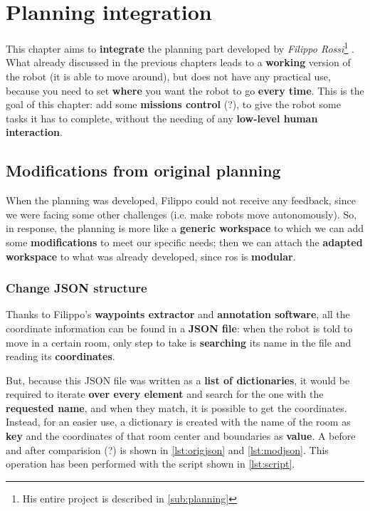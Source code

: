 \chapter{Planning integration} %
\label{cha:planningbridge}

This chapter aims to \textbf{integrate} the planning part developed by \textit{Filippo Rossi}\footnote{His entire project is described in \autoref{sub:planning}} \cite{fr}. What already discussed in the previous chapters leads to a \textbf{working} version of the robot (it is able to move around), but does not have any practical use, because you need to set \textbf{where} you want the robot to go \textbf{every time}. This is the goal of this chapter: add some \textbf{missions control} (?), to give the robot some tasks it has to complete, without the needing of any \textbf{low-level human interaction}.

\section{Modifications from original planning}

When the planning was developed, Filippo could not receive any feedback, since we were facing some other challenges (i.e. make robots move autonomously). So, in response, the planning is more like a \textbf{generic workspace} to which we can add some \textbf{modifications} to meet our specific needs; then we can attach the \textbf{adapted workspace} to what was already developed, since \acrshort{ros} is \textbf{modular}.


\subsection{Change JSON structure}
\label{sub:json}

Thanks to Filippo's \textbf{waypoints extractor} and  \textbf{annotation software}, all the coordinate information can be found in a \textbf{JSON file}: when the robot is told to move in a certain room, only step to take is \textbf{searching} its name in the file and reading its \textbf{coordinates}.

But, because this JSON file was written as a \textbf{list of dictionaries}, it would be required to iterate \textbf{over every element} and search for the one with the \textbf{requested name}, and when they match, it is possible to get the coordinates. Instead, for an easier use, a dictionary is created with the name of the room as \textbf{key} and the coordinates of that room center and boundaries as \textbf{value}. A before and after comparision (?) is shown in \autoref{lst:origjson} and \autoref{lst:modjson}. This operation has been performed with the  script shown in \autoref{lst:script}.

